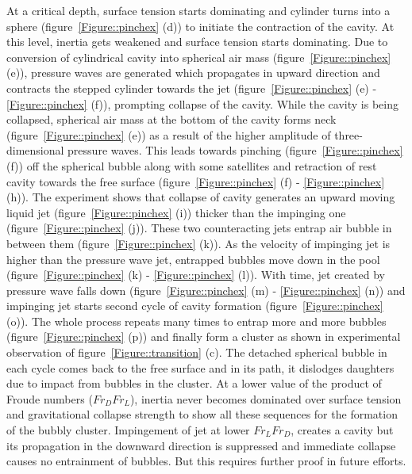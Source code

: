 At a critical depth, surface tension starts dominating and cylinder turns into a sphere (figure~\ref{Figure::pinchex} (d)) to initiate the contraction of the cavity. At this level, inertia gets weakened and surface tension starts dominating. Due to conversion of cylindrical cavity into spherical air mass (figure~\ref{Figure::pinchex} (e)), pressure waves are generated which propagates in upward direction and contracts the stepped cylinder towards the jet (figure~\ref{Figure::pinchex} (e) - \ref{Figure::pinchex} (f)), prompting collapse of the cavity. While the cavity is being collapsed, spherical air mass at the bottom of the cavity forms neck (figure~\ref{Figure::pinchex} (e)) as a result of the higher amplitude of three-dimensional pressure waves. This leads towards pinching (figure~\ref{Figure::pinchex} (f)) off the spherical bubble along with some satellites and retraction of rest cavity towards the free surface (figure~\ref{Figure::pinchex} (f) - \ref{Figure::pinchex} (h)). The experiment shows that collapse of cavity generates an upward moving liquid jet (figure~\ref{Figure::pinchex} (i)) thicker than the impinging one (figure~\ref{Figure::pinchex} (j)). These two counteracting jets entrap air bubble in between them (figure~\ref{Figure::pinchex} (k)). As the velocity of impinging jet is higher than the pressure wave jet, entrapped bubbles move down in the pool (figure~\ref{Figure::pinchex} (k) - \ref{Figure::pinchex} (l)). With time, jet created by pressure wave falls down (figure~\ref{Figure::pinchex} (m) - \ref{Figure::pinchex} (n)) and impinging jet starts second cycle of cavity formation (figure~\ref{Figure::pinchex} (o)). The whole process repeats many times to entrap more and more bubbles (figure~\ref{Figure::pinchex} (p)) and finally form a cluster as shown in experimental observation of figure~\ref{Figure::transition} (c). The detached spherical bubble in each cycle comes back to the free surface and in its path, it dislodges daughters due to impact from bubbles in the cluster. At a lower value of the product of Froude numbers ($Fr_DFr_L$), inertia never becomes dominated over surface tension and gravitational collapse strength to show all these sequences for the formation of the bubbly cluster. Impingement of jet at lower $Fr_LFr_D$, creates a cavity but its propagation in the downward direction is suppressed and immediate collapse causes no entrainment of bubbles. But this requires further proof in future efforts.\\
